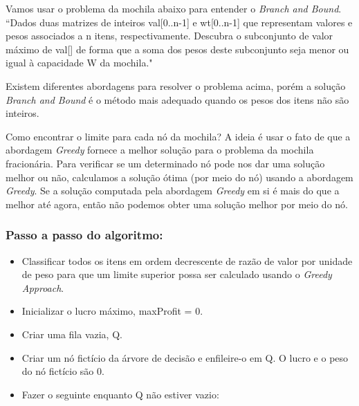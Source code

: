 Vamos usar o problema da mochila abaixo para entender o \emph{Branch and Bound}.
``Dados duas matrizes de inteiros val[0..n-1] e wt[0..n-1] que representam valores e pesos associados a n itens, respectivamente. 
Descubra o subconjunto de valor máximo de val[] de forma que a soma dos pesos deste subconjunto seja menor ou igual à capacidade W da mochila."

Existem diferentes abordagens para resolver o problema acima, porém a solução \emph{Branch and Bound} é o método mais adequado quando os pesos dos itens não são inteiros.

Como encontrar o limite para cada nó da mochila?
A ideia é usar o fato de que a abordagem \emph{Greedy} fornece a melhor solução para o problema da mochila fracionária.
Para verificar se um determinado nó pode nos dar uma solução melhor ou não, calculamos a solução ótima (por meio do nó) usando a abordagem \emph{Greedy}. 
Se a solução computada pela abordagem \emph{Greedy} em si é mais do que a melhor até agora, então não podemos obter uma solução melhor por meio do nó.

\subsubsection*{Passo a passo do algoritmo:}

\begin{itemize}
    \item Classificar todos os itens em ordem decrescente de razão de valor por unidade de peso para que um limite superior possa ser calculado usando o \emph{Greedy Approach}.
    \item Inicializar o lucro máximo, maxProfit = 0.
    \item Criar uma fila vazia, Q.
    \item Criar um nó fictício da árvore de decisão e enfileire-o em Q. O lucro e o peso do nó fictício são 0.
\end{itemize}

\begin{itemize}
    \item Fazer o seguinte enquanto Q não estiver vazio:
\end{itemize}
 
